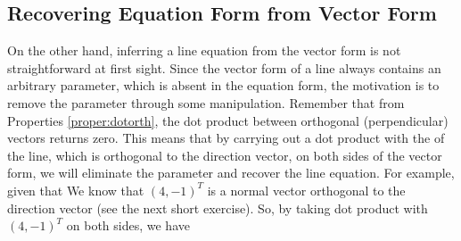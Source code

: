 \subsection{Recovering Equation Form from Vector Form} On the other hand, inferring a line equation from the vector form is not straightforward at first sight. Since the vector form of a line always contains an arbitrary parameter, which is absent in the equation form, the motivation is to remove the parameter through some manipulation. Remember that from Properties \ref{proper:dotorth}, the dot product between orthogonal (perpendicular) vectors returns zero. This means that by carrying out a dot product with the  of the line, which is orthogonal to the direction vector, on both sides of the vector form, we will eliminate the parameter and recover the line equation. For example, given that
We know that $(4, -1)^T$ is a normal vector orthogonal to the direction vector (see the next short exercise). So, by taking dot product with $(4, -1)^T$ on both sides, we have
